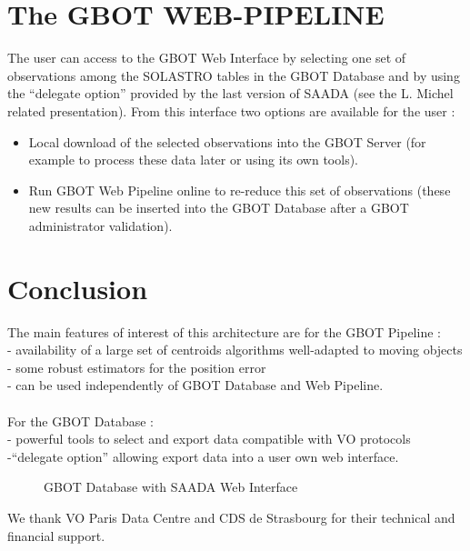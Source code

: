 \documentclass[11pt,twoside]{article}
\begin{document}
\section{The GBOT WEB-PIPELINE}
The user can access to the GBOT Web Interface by selecting one set of observations among the SOLASTRO tables
in the GBOT Database and by using the “delegate option” provided by the last version of SAADA
(see the L. Michel related presentation). From this interface two options are available for the user :
\begin{itemize}
\item Local download of the selected observations into the GBOT Server
(for example to process these data later or using its own tools).\\
\item Run GBOT Web Pipeline online to re-reduce this set of observations
(these new results can be inserted into the GBOT Database after a GBOT administrator validation).
\end{itemize}

\section{Conclusion}
The main features of interest of this architecture  are for the GBOT Pipeline :\\
\hspace*{0.25cm}- availability of a large set of centroids algorithms well-adapted to moving objects\\
\hspace*{0.25cm}- some robust estimators for the position error \\
\hspace*{0.25cm}- can be used independently of GBOT Database and Web Pipeline.\\\\
For the GBOT Database : \\
\hspace*{0.25cm}- powerful tools to select and export data compatible with VO protocols \\
\hspace*{0.25cm}-“delegate option” allowing export data into a user own web interface.

\begin{figure}[ht]
\caption{GBOT Database with SAADA Web Interface} \label{P03-fig-1}
\end{figure}



\acknowledgements 
We thank VO Paris Data Centre and CDS de Strasbourg for their technical and financial support.



\end{document}
